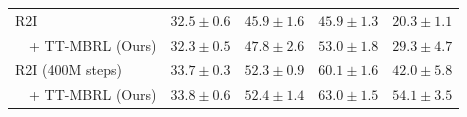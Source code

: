 \begin{table}[ht]
\begin{tabular}{lcccc}
    \midrule
    R2I & $\mathbf{32.5 \pm 0.6}$ & $45.9 \pm 1.6$ & $45.9 \pm 1.3$ & $20.3 \pm 1.1$ \\
    ~~+ TT-MBRL (Ours) & $32.3 \pm 0.5$ & $\mathbf{47.8 \pm 2.6}$ & $\mathbf{53.0 \pm 1.8}$ & $\mathbf{29.3 \pm 4.7}$ \\
    \midrule
    R2I (400M steps) & $33.7 \pm 0.3$ & $52.3 \pm 0.9$ & $60.1 \pm 1.6$ & $42.0 \pm 5.8$ \\
    ~~+ TT-MBRL (Ours)& $\mathbf{33.8 \pm 0.6}$ & $\mathbf{52.4 \pm 1.4}$ & $\mathbf{63.0 \pm 1.5}$ & $\mathbf{54.1 \pm 3.5}$ \\
    \bottomrule
    \end{tabular}
    \label{table:results_maze}
\end{table}